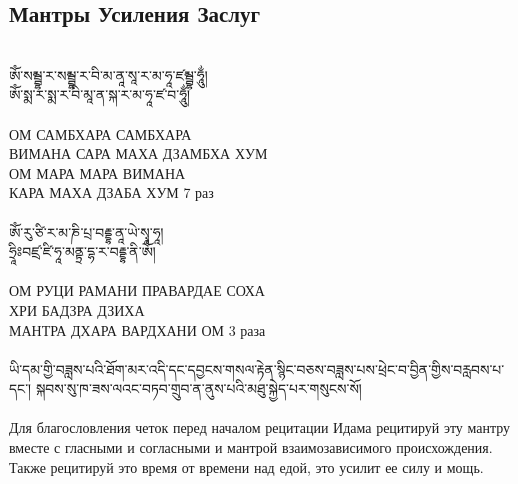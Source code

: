 \subsection*{Мантры Усиления Заслуг}
\\
\ti
ཨོཾ་སམྦྷ་ར་སམྦྷ་ར་བི་མ་ནཱ་སཱ་ར་མ་ཧཱ་ཛམྦྷ་ཧཱུྂ།\\
ཨོཾ་སྨ་ར་སྨ་ར་བི་མཱ་ན་སྐ་ར་མ་ཧཱ་ཛ་བ་ཧཱུྂ།\\
\\
\ru
ОМ САМБХАРА САМБХАРА\\
ВИМАНА САРА МАХА ДЗАМБХА ХУМ\\
ОМ МАРА МАРА ВИМАНА\\
КАРА МАХА ДЗАБА ХУМ \hspace{1cm} 7 раз\\
\\
\ti
ཨོཾ་རུ་ཙི་ར་མ་ཎི་པྲ་བརྡྷ་ནཱ་ཡེ་སྭཱ་ཧཱ།\\
ཧྲཱིཿབཛྲ་ཛི་ཧཱ་མནྟྲ་དྷ་ར་བརྡྷ་ནི་ཨོཾ།\\
\\
\ru
ОМ РУЦИ РАМАНИ ПРАВАРДАЕ СОХА\\
ХРИ БАДЗРА ДЗИХА\\
МАНТРА ДХАРА ВАРДХАНИ ОМ \hspace{1cm} 3 раза\\
\\
\scriptsize
\ti ཡི་དམ་གྱི་བཟླས་པའི་ཐོག་མར་འདི་དང་དབྱངས་གསལ་རྟེན་སྙིང་བཅས་བཟླས་པས་ཕྲེང་བ་བྱིན་གྱིས་བརླབས་པ་དང་།
སྐབས་སུ་ཁ་ཟས་ལའང་བཏབ་གྲུབ་ན་ནུས་པའི་མཐུ་སྐྱེད་པར་གསུངས་སོ།\\
\\
\ru Для благословления четок перед началом рецитации Идама
рецитируй эту мантру вместе с гласными и согласными
и мантрой взаимозависимого происхождения.
Также рецитируй это время от времени над едой, это усилит ее силу и мощь.
\normalsize